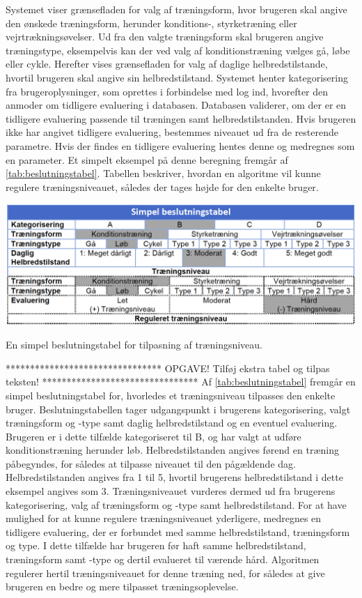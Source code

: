 \noindent
Systemet viser grænsefladen for valg af træningsform, hvor brugeren skal angive den ønskede træningsform, herunder konditions-, styrketræning eller vejrtrækningsøvelser. Ud fra den valgte træningsform skal brugeren angive træningstype, eksempelvis kan der ved valg af konditionstræning vælges gå, løbe eller cykle. Herefter vises grænsefladen for valg af daglige helbredstilstande, hvortil brugeren skal angive sin helbredstilstand. Systemet henter kategorisering fra brugeroplysninger, som oprettes i forbindelse med log ind, hvorefter den anmoder om tidligere evaluering i databasen. Databasen validerer, om der er en tidligere evaluering passende til træningen samt helbredstilstanden. Hvis brugeren ikke har angivet tidligere evaluering, bestemmes niveauet ud fra de resterende parametre. Hvis der findes en tidligere evaluering hentes denne og medregnes som en parameter. Et simpelt eksempel på denne beregning fremgår af \autoref{tab:beslutningstabel}. Tabellen beskriver, hvordan en algoritme vil kunne regulere træningsniveauet, således der tages højde for den enkelte bruger.

\begin{table}[H]
\centering
\includegraphics[width=1\textwidth]{figures/aktivitetsdiagram/beslutningstabel}
\caption{En simpel beslutningstabel for tilpasning af træningsniveau.}
\label{tab:beslutningstabel}
\end{table} 

\noindent
 ******************************** OPGAVE! Tilføj ekstra tabel og tilpas teksten! ********************************
Af \autoref{tab:beslutningstabel} fremgår en simpel beslutningstabel for, hvorledes et træningsniveau tilpasses den enkelte bruger. Beslutningstabellen tager udgangspunkt i brugerens kategorisering, valgt træningsform og -type samt daglig helbredstilstand og en eventuel evaluering. Brugeren er i dette tilfælde kategoriseret til B, og har valgt at udføre konditionstræning herunder løb. Helbredstilstanden angives førend en træning påbegyndes, for således at tilpasse niveauet til den pågældende dag. Helbredstilstanden angives fra 1 til 5, hvortil brugerens helbredstilstand i dette eksempel angives som 3.
Træningsniveauet vurderes dermed ud fra brugerens kategorisering, valg af træningsform og -type samt helbredstilstand. 
For at have mulighed for at kunne regulere træningsniveauet yderligere, medregnes en tidligere evaluering, der er forbundet med samme helbredstilstand, træningsform og type. I dette tilfælde har brugeren før haft samme helbredstilstand, træningsform samt -type og dertil evalueret til værende hård. Algoritmen regulerer hertil træningsniveauet for denne træning ned, for således at give brugeren en bedre og mere tilpasset træningsoplevelse. 


